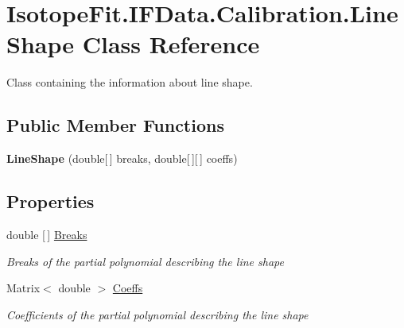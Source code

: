 \hypertarget{class_isotope_fit_1_1_i_f_data_1_1_calibration_1_1_line_shape}{}\section{Isotope\+Fit.\+I\+F\+Data.\+Calibration.\+Line\+Shape Class Reference}
\label{class_isotope_fit_1_1_i_f_data_1_1_calibration_1_1_line_shape}


Class containing the information about line shape.  


\subsection*{Public Member Functions}
\begin{DoxyCompactItemize}
\item 
\mbox{\label{class_isotope_fit_1_1_i_f_data_1_1_calibration_1_1_line_shape_ab5ed4d295ead4741f309d80fee17addc}} 
{\bfseries Line\+Shape} (double\mbox{[}$\,$\mbox{]} breaks, double\mbox{[}$\,$\mbox{]}\mbox{[}$\,$\mbox{]} coeffs)
\end{DoxyCompactItemize}
\subsection*{Properties}
\begin{DoxyCompactItemize}
\item 
double \mbox{[}$\,$\mbox{]} \mbox{\hyperlink{class_isotope_fit_1_1_i_f_data_1_1_calibration_1_1_line_shape_a447511120da7a7c67677aeb723cffd77}{Breaks}}
\begin{DoxyCompactList}\small\item\em Breaks of the partial polynomial describing the line shape \end{DoxyCompactList}\item 
Matrix$<$ double $>$ \mbox{\hyperlink{class_isotope_fit_1_1_i_f_data_1_1_calibration_1_1_line_shape_a8892e37963113bc557f3324a10ff82a0}{Coeffs}}
\begin{DoxyCompactList}\small\item\em Coefficients of the partial polynomial describing the line shape \end{DoxyCompactList}\end{DoxyCompactItemize}


